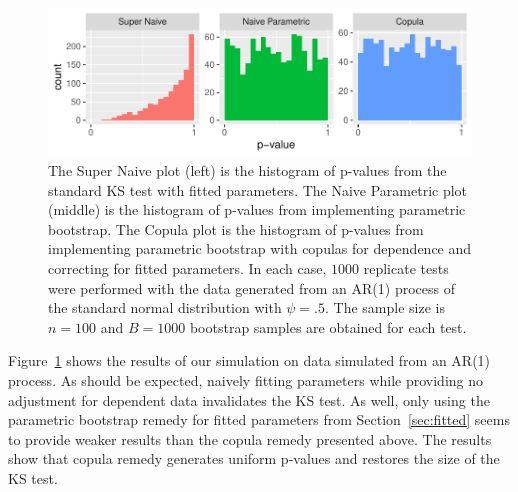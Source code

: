 \documentclass[12pt, letterpaper, titlepage]{article}
\begin{document}
\begin{figure}[tbp]
  \centering
  \includegraphics[width=\textwidth]{hist_ar1_FD}
  \caption{The Super Naive plot (left) is the histogram of p-values from the
  standard KS test with fitted parameters. The Naive Parametric plot (middle) is
  the histogram of p-values from implementing parametric bootstrap. The Copula
  plot is the histogram of p-values from implementing parametric bootstrap with
  copulas for dependence and correcting for fitted parameters. In each case,
  $1000$ replicate tests were performed with the data generated from an AR(1)
  process of the standard normal distribution with $\psi = .5$. The sample size
  is $n = 100$ and $B = 1000$ bootstrap samples are obtained for each test.}
  \label{fig:hist_ar1_FD}
\end{figure}

Figure~\ref{fig:hist_ar1_FD} shows the results of our simulation on data
simulated from an AR(1) process. As should be expected, naively fitting
parameters while providing no adjustment for dependent data invalidates the KS
test. As well, only using the parametric bootstrap remedy for fitted parameters
from Section~\ref{sec:fitted} seems to provide weaker results than the
copula remedy presented above. The results show that copula remedy generates
uniform p-values and restores the size of the KS test.
\end{document}
